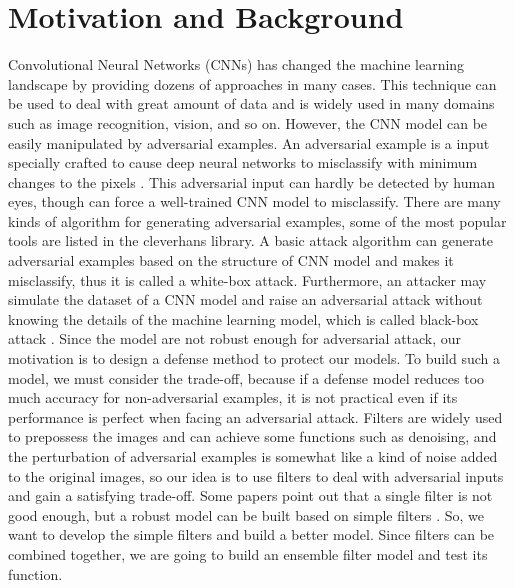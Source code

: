 \section{Motivation and Background} \label{s:motivationAndBackground}
Convolutional Neural Networks (CNNs) has changed the machine learning landscape by providing dozens of approaches in many cases. This technique can be used to deal with great amount of data and is widely used in many domains such as image recognition, vision, and so on. However, the CNN model can be easily manipulated by adversarial examples. An adversarial example is a input specially crafted to cause deep neural networks to misclassify with minimum changes to the pixels \cite{adversarial}. This adversarial input can hardly be detected by human eyes, though can force a well-trained CNN model to misclassify. There are many kinds of algorithm for generating adversarial examples, some of the most popular tools are listed in the cleverhans library. A basic attack algorithm can generate adversarial examples based on the structure of CNN model and makes it misclassify, thus it is called a white-box attack. Furthermore, an attacker may simulate the dataset of a CNN model and raise an adversarial attack without knowing the details of the machine learning model, which is called black-box attack \cite{blackbox}.
Since the model are not robust enough for adversarial attack, our motivation is to design a defense method to protect our models. To build such a model, we must consider the trade-off, because if a defense model reduces too much accuracy for non-adversarial examples, it is not practical even if its performance is perfect when facing an adversarial attack. Filters are widely used to prepossess the images and can achieve some functions such as denoising, and the perturbation of adversarial examples is somewhat like a kind of noise added to the original images, so our idea is to use filters to deal with adversarial inputs and gain a satisfying trade-off. Some papers point out that a single filter is not good enough, but a robust model can be built based on simple filters \cite{ComplexFilter}. So, we want to develop the simple filters and build a better model. Since filters can be combined together, we are going to build an ensemble filter model and test its function.
